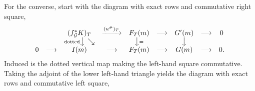 For the converse, start with the diagram with exact rows and commutative
right square,
\[
\begin{array}{ccccccccc}
&& (f_{\mathcal G}^*K)_T&\xrightarrow{(u^\#)_T}&F_T(m)
&\longrightarrow&G'(m)&\longrightarrow&0
\\
&&{\scriptstyle\mathrm{dotted}}\big\downarrow\,\searrow
&&\big\downarrow{\scriptstyle =}
&&\big\downarrow
\\
0&\longrightarrow&I(m)&\longrightarrow&F_T(m)
&\longrightarrow&G(m)&\longrightarrow&0.
\end{array}
\]
Induced is the dotted vertical map making the left-hand square commutative.
Taking the adjoint of the lower left-hand triangle yields the diagram with
exact rows and commutative left square,
